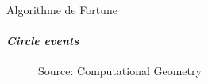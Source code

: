 \begin{frame}{Algorithme de Fortune}
\framesubtitle{\textit{Circle events}}
\begin{figure}
    \centering
    \def\stackalignment{r}
       {\sources
        Source: Computational Geometry}
\end{figure}
\end{frame}


